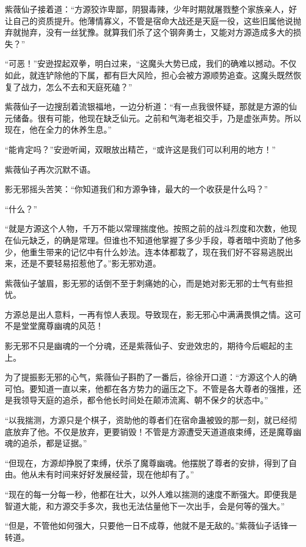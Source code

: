 \begin{this_body}
紫薇仙子接着道：“方源狡诈卑鄙，阴狠毒辣，少年时期就屠戮整个家族亲人，好让自己的资质提升。他薄情寡义，不管是宿命大战还是天庭一役，这些旧属他说抛弃就抛弃，没有一丝犹豫。就算我们杀了这个钢奔勇士，又能对方源造成多大的损失？”

“可恶！”安逊捏起双拳，明白过来，“这魔头大势已成，我们的确难以撼动。不仅如此，就连铲除他的下属，都有巨大风险，担心会被方源顺势追查。这魔头既然恢复了战力，怎么不去和天庭死磕？”

紫薇仙子一边搜刮着流银福地，一边分析道：“有一点我很怀疑，那就是方源的仙元储备。很有可能，他现在缺乏仙元。之前和气海老祖交手，乃是虚张声势。所以现在，他在全力的休养生息。”

“能肯定吗？”安逊听闻，双眼放出精芒，“或许这是我们可以利用的地方！”

紫薇仙子再次沉默不语。

影无邪摇头苦笑：“你知道我们和方源争锋，最大的一个收获是什么吗？”

“什么？”

“就是方源这个人物，千万不能以常理揣度他。按照之前的战斗烈度和次数，他现在仙元缺乏，的确是常理。但谁也不知道他掌握了多少手段，尊者暗中资助了他多少，他重生带来的记忆中有什么妙法。连本体都栽了，现在我们好不容易逃脱出来，还是不要轻易招惹他了。”影无邪劝道。

紫薇仙子皱眉，影无邪的话倒不至于刺痛她的心，而是她对影无邪的士气有些担忧。

方源总是出人意料，一再有惊人表现。导致现在，影无邪心中满满畏惧之情。这可不是堂堂魔尊幽魂的风范！

影无邪不只是幽魂的一个分魂，还是紫薇仙子、安逊效忠的，期待今后崛起的主上。

为了提振影无邪的心气，紫薇仙子斟酌了一番后，徐徐开口道：“方源这个人的确可怕。要知道一直以来，他都在各方势力的逼压之下。不管是各大尊者的强推，还是我领导天庭的追杀，都令他长时间处在颠沛流离、朝不保夕的状态中。”

“以我揣测，方源只是个棋子，资助他的尊者们在宿命蛊被毁的那一刻，就已经彻底放弃了他。不仅是放弃，更要销毁！不管是方源遭受天道道痕束缚，还是魔尊幽魂的追杀，都是证据。”

“但现在，方源却挣脱了束缚，伏杀了魔尊幽魂。他摆脱了尊者的安排，得到了自由。他从未有时间来好好发展经营，现在他却有了。”

“现在的每一分每一秒，他都在壮大，以外人难以揣测的速度不断强大。即便我是智道大能，和方源交手多次，我也无法估量他下一次出手，会是何等的强大。”

“但是，不管他如何强大，只要他一日不成尊，他就不是无敌的。”紫薇仙子话锋一转道。


\end{this_body}
